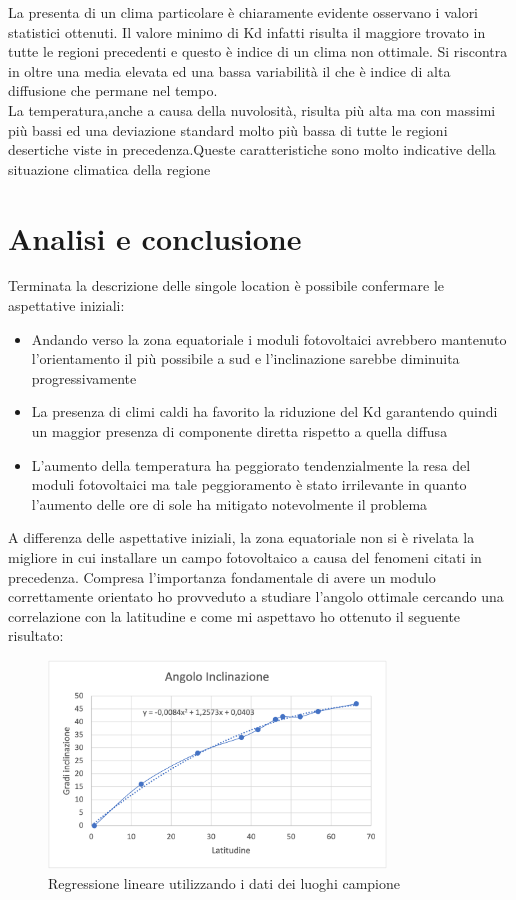 La presenta di un clima particolare è chiaramente evidente osservano i valori statistici ottenuti. Il valore minimo di Kd infatti risulta il maggiore trovato in tutte le regioni precedenti e questo è indice di un clima non ottimale. Si riscontra in oltre una media elevata ed una bassa variabilità il che è indice di alta diffusione che permane nel tempo.\\
La temperatura,anche a causa della nuvolosità, risulta più alta ma con massimi più bassi ed una deviazione standard molto più bassa di tutte le regioni desertiche viste in precedenza.Queste caratteristiche sono molto indicative della situazione climatica della regione\\
\vfill
\newpage
\section{Analisi e conclusione}
Terminata la descrizione delle singole location è possibile confermare le aspettative iniziali:
\begin{itemize}
    \item Andando verso la zona equatoriale i moduli fotovoltaici avrebbero mantenuto l'orientamento il più possibile a sud e l'inclinazione sarebbe diminuita progressivamente
    \item La presenza di climi caldi ha favorito la riduzione del Kd garantendo quindi un maggior presenza di componente diretta rispetto a quella diffusa
    \item L'aumento della temperatura ha peggiorato tendenzialmente la resa del moduli fotovoltaici ma tale peggioramento è stato irrilevante in quanto l'aumento delle ore di sole ha mitigato notevolmente il problema
\end{itemize}
A differenza delle aspettative iniziali, la zona equatoriale non si è rivelata la migliore in cui installare un campo fotovoltaico a causa del fenomeni citati in precedenza.
Compresa l'importanza fondamentale di avere un modulo correttamente orientato ho provveduto a studiare l'angolo ottimale cercando una correlazione con la latitudine e come mi aspettavo ho ottenuto il seguente risultato:
\begin{figure}[H]
    \centering
    \includegraphics[width=0.8\textwidth]{res/cap 5/regressione lineare}
    \caption{Regressione lineare utilizzando i dati dei luoghi campione}
\end{figure}\noindent
